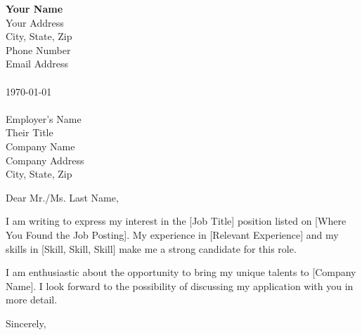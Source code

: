 \documentclass{article}
\begin{document}
\noindent
\textbf{\LARGE Your Name}\\
Your Address\\
City, State, Zip\\
Phone Number\\
Email Address\\
\\
\today\\
\\
Employer's Name\\
Their Title\\
Company Name\\
Company Address\\
City, State, Zip

\bigskip
Dear Mr./Ms. Last Name,

\bigskip
I am writing to express my interest in the [Job Title] position listed on [Where You Found the Job Posting]. My experience in [Relevant Experience] and my skills in [Skill, Skill, Skill] make me a strong candidate for this role.


\bigskip
I am enthusiastic about the opportunity to bring my unique talents to [Company Name]. I look forward to the possibility of discussing my application with you in more detail.

\bigskip
Sincerely,\\
\end{document}
